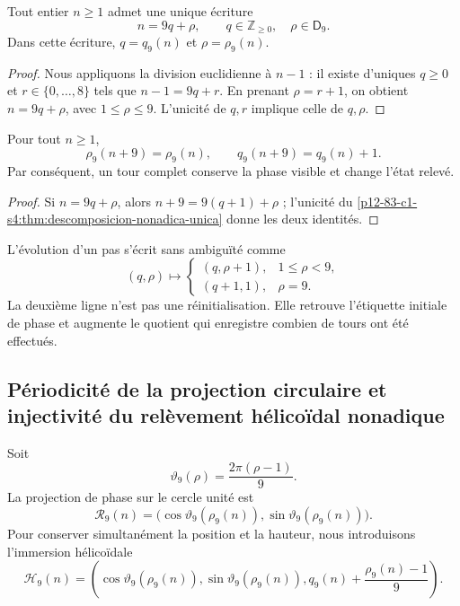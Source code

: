 \begin{theorem}
\label{p12-83-c1-s4:thm:descomposicion-nonadica-unica}
Tout entier \(n\geq1\) admet une unique écriture
\[
 n=9q+\rho,
 \qquad q\in\mathbb Z_{\geq0},\quad \rho\in\mathsf D_9.
\]
Dans cette écriture, \(q=q_9(n)\) et \(\rho=\rho_9(n)\).
\end{theorem}

\begin{proof}
Nous appliquons la division euclidienne à \(n-1\) : il existe d’uniques
\(q\geq0\) et \(r\in\{0,\ldots,8\}\) tels que
\(n-1=9q+r\). En prenant \(\rho=r+1\), on obtient
\(n=9q+\rho\), avec \(1\leq\rho\leq9\). L’unicité de \(q,r\) implique celle
de \(q,\rho\).
\end{proof}

\begin{corollary}
\label{p12-83-c1-s4:cor:retorno-fase-incremento-memoria}
Pour tout \(n\geq1\),
\[
 \rho_9(n+9)=\rho_9(n),
 \qquad
 q_9(n+9)=q_9(n)+1.
\]
Par conséquent, un tour complet conserve la phase visible et change
l’état relevé.
\end{corollary}

\begin{proof}
Si \(n=9q+\rho\), alors \(n+9=9(q+1)+\rho\) ; l’unicité du
\cref{p12-83-c1-s4:thm:descomposicion-nonadica-unica} donne les deux identités.
\end{proof}

L’évolution d’un pas s’écrit sans ambiguïté comme
\[
 (q,\rho)\longmapsto
 \begin{cases}
 (q,\rho+1),&1\leq\rho<9,\\
 (q+1,1),&\rho=9.
 \end{cases}
\]
La deuxième ligne n’est pas une réinitialisation. Elle retrouve l’étiquette initiale de phase et
augmente le quotient qui enregistre combien de tours ont été effectués.

\subsection{Périodicité de la projection circulaire et injectivité du relèvement hélicoïdal nonadique}

Soit
\[
 \vartheta_9(\rho)=\frac{2\pi(\rho-1)}9.
\]
La projection de phase sur le cercle unité est
\[
 \mathcal R_9(n)=
 \bigl(\cos\vartheta_9(\rho_9(n)),
       \sin\vartheta_9(\rho_9(n))\bigr).
\]
Pour conserver simultanément la position et la hauteur, nous introduisons
l’immersion hélicoïdale
\[
 \mathcal H_9(n)=
 \left(
  \cos\vartheta_9(\rho_9(n)),
  \sin\vartheta_9(\rho_9(n)),
  q_9(n)+\frac{\rho_9(n)-1}{9}
 \right).
\]

